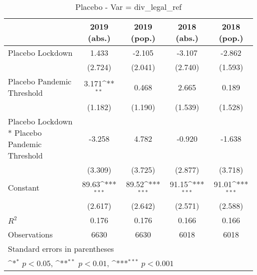 \documentclass{article}
\begin{document}
{
\def\sym#1{\ifmmode^{#1}\else\(^{#1}\)\fi}
\begin{longtable}{l*{4}{c}}
\caption{Placebo - Var = div\_legal\_ref}\\
\hline\hline\endfirsthead\hline\endhead\hline\endfoot\endlastfoot
                &\multicolumn{1}{c}{2019 (abs.)}&\multicolumn{1}{c}{2019 (pop.)}&\multicolumn{1}{c}{2018 (abs.)}&\multicolumn{1}{c}{2018 (pop.)}\\
\hline
Placebo Lockdown&    1.433         &   -2.105         &   -3.107         &   -2.862         \\
                &  (2.724)         &  (2.041)         &  (2.740)         &  (1.593)         \\
Placebo Pandemic Threshold&    3.171\sym{**} &    0.468         &    2.665         &    0.189         \\
                &  (1.182)         &  (1.190)         &  (1.539)         &  (1.528)         \\
Placebo Lockdown * Placebo Pandemic Threshold&   -3.258         &    4.782         &   -0.920         &   -1.638         \\
                &  (3.309)         &  (3.725)         &  (2.877)         &  (3.718)         \\
Constant        &    89.63\sym{***}&    89.52\sym{***}&    91.15\sym{***}&    91.01\sym{***}\\
                &  (2.617)         &  (2.642)         &  (2.571)         &  (2.588)         \\
\hline
\(R^{2}\)       &    0.176         &    0.176         &    0.166         &    0.166         \\
Observations    &     6630         &     6630         &     6018         &     6018         \\
\hline\hline
\multicolumn{5}{l}{\footnotesize Standard errors in parentheses}\\
\multicolumn{5}{l}{\footnotesize \sym{*} \(p<0.05\), \sym{**} \(p<0.01\), \sym{***} \(p<0.001\)}\\
\end{longtable}
}
\end{document}
